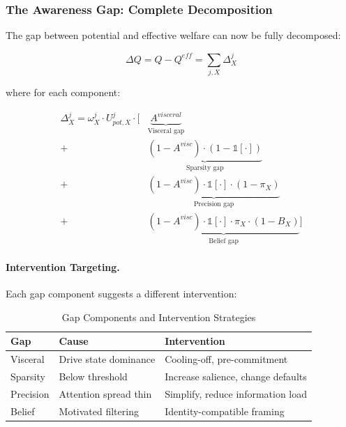 \subsubsection{The Awareness Gap: Complete Decomposition}
\label{subsubsec:awareness-gap}

The gap between potential and effective welfare can now be fully decomposed:

\begin{equation}
\Delta Q = Q - Q^{eff} = \sum_{j,X} \Delta^j_X
\end{equation}

where for each component:

\begin{align}
\Delta^j_X = \omega^j_X \cdot U^j_{pot,X} \cdot \Big[ 
& \underbrace{A^{visceral}}_{\text{Visceral gap}} \nonumber \\
+ \; & \underbrace{(1-A^{visc}) \cdot (1 - \mathbb{1}[\cdot])}_{\text{Sparsity gap}} \nonumber \\
+ \; & \underbrace{(1-A^{visc}) \cdot \mathbb{1}[\cdot] \cdot (1 - \pi_X)}_{\text{Precision gap}} \nonumber \\
+ \; & \underbrace{(1-A^{visc}) \cdot \mathbb{1}[\cdot] \cdot \pi_X \cdot (1 - B_X)}_{\text{Belief gap}} \Big]
\end{align}

\paragraph{Intervention Targeting.}
Each gap component suggests a different intervention:

\begin{table}[htbp]
\centering
\caption{Gap Components and Intervention Strategies}
\label{tab:gap-interventions}
\renewcommand{\arraystretch}{1.3}
\begin{tabular}{@{}lll@{}}
\toprule
\textbf{Gap} & \textbf{Cause} & \textbf{Intervention} \\
\midrule
Visceral & Drive state dominance & Cooling-off, pre-commitment \\
Sparsity & Below threshold & Increase salience, change defaults \\
Precision & Attention spread thin & Simplify, reduce information load \\
Belief & Motivated filtering & Identity-compatible framing \\
\bottomrule
\end{tabular}
\end{table}

